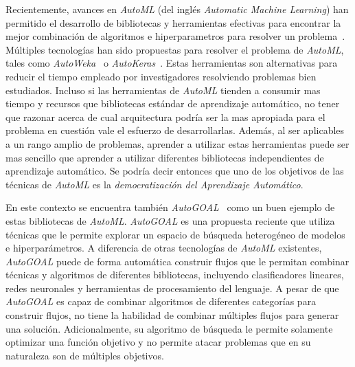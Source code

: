 Recientemente, avances en \emph{AutoML} (del inglés \emph{Automatic Machine Learning}) han permitido el desarrollo de bibliotecas y herramientas efectivas para encontrar la mejor combinación de algoritmos e hiperparametros para resolver un problema~.
Múltiples tecnologías han sido propuestas para resolver el problema de \emph{AutoML}, tales como \emph{AutoWeka}~\parencite{autoweka} o \emph{AutoKeras}~\parencite{autoKeras}.
Estas herramientas son alternativas para reducir el tiempo empleado por investigadores resolviendo problemas bien estudiados.
Incluso si las herramientas de \emph{AutoML} tienden a consumir mas tiempo y recursos que bibliotecas estándar de aprendizaje automático, no tener que razonar acerca de cual arquitectura podría ser la mas apropiada para el problema en cuestión vale el esfuerzo de desarrollarlas.
Además, al ser aplicables a un rango amplio de problemas, aprender a utilizar estas herramientas puede ser mas sencillo que aprender a utilizar diferentes bibliotecas independientes de aprendizaje automático.
Se podría decir entonces que uno de los objetivos de las técnicas de \emph{AutoML} es la \emph{democratización del Aprendizaje Automático}.


En este contexto se encuentra también \emph{AutoGOAL}~\parencite{autogoal} como un buen ejemplo de estas bibliotecas de \emph{AutoML}.
\emph{AutoGOAL} es una propuesta reciente que utiliza técnicas que le permite explorar un espacio de búsqueda heterogéneo de modelos e hiperparámetros.
A diferencia de otras tecnologías de \emph{AutoML} existentes, \emph{AutoGOAL} puede de forma automática construir flujos que le permitan combinar técnicas y algoritmos de diferentes bibliotecas, incluyendo clasificadores lineares, redes neuronales y herramientas de procesamiento del lenguaje.
A pesar de que \emph{AutoGOAL} es capaz de combinar algoritmos de diferentes categorías para construir flujos, no tiene la habilidad de combinar múltiples flujos para generar una solución.
Adicionalmente, su algoritmo de búsqueda le permite solamente optimizar una función objetivo y no permite atacar problemas que en su naturaleza son de múltiples objetivos.


